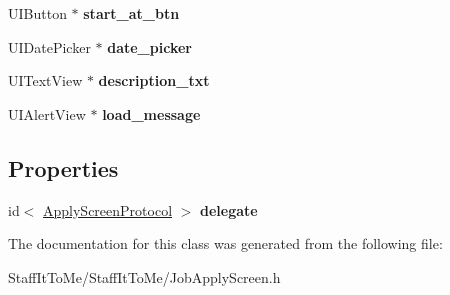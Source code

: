 \begin{DoxyCompactItemize}
\item 
\hypertarget{interface_job_apply_screen_ac959e22f152888344228e6896218fd7a}{
\-U\-I\-Button $\ast$ {\bfseries start\-\_\-at\-\_\-btn}}
\label{interface_job_apply_screen_ac959e22f152888344228e6896218fd7a}

\item 
\hypertarget{interface_job_apply_screen_a34e21d04fef705d36078b754a5ab68ac}{
\-U\-I\-Date\-Picker $\ast$ {\bfseries date\-\_\-picker}}
\label{interface_job_apply_screen_a34e21d04fef705d36078b754a5ab68ac}

\item 
\hypertarget{interface_job_apply_screen_abd760ba343fe6a46e62e0318a0cf5358}{
\-U\-I\-Text\-View $\ast$ {\bfseries description\-\_\-txt}}
\label{interface_job_apply_screen_abd760ba343fe6a46e62e0318a0cf5358}

\item 
\hypertarget{interface_job_apply_screen_af4f9b5b2c9c106da0649004789d8ed5e}{
\-U\-I\-Alert\-View $\ast$ {\bfseries load\-\_\-message}}
\label{interface_job_apply_screen_af4f9b5b2c9c106da0649004789d8ed5e}

\end{DoxyCompactItemize}
\subsection*{\-Properties}
\begin{DoxyCompactItemize}
\item 
\hypertarget{interface_job_apply_screen_a3e5039eacd093eef364fa58f83886ba0}{
id$<$ \hyperlink{protocol_apply_screen_protocol-p}{\-Apply\-Screen\-Protocol} $>$ {\bfseries delegate}}
\label{interface_job_apply_screen_a3e5039eacd093eef364fa58f83886ba0}

\end{DoxyCompactItemize}


\-The documentation for this class was generated from the following file\-:\begin{DoxyCompactItemize}
\item 
\-Staff\-It\-To\-Me/\-Staff\-It\-To\-Me/\-Job\-Apply\-Screen.\-h\end{DoxyCompactItemize}
